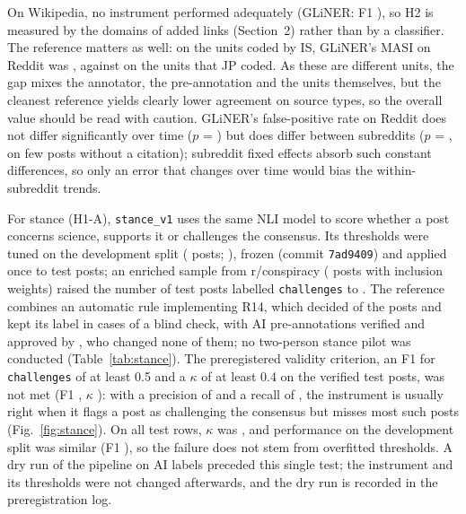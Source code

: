\documentclass[10pt,a4paper]{article}
\newcommand{\kod}[1]{\texttt{#1}}
\begin{document}
On Wikipedia, no instrument performed adequately (GLiNER: F1 \resTestGlinerWikipediaCitesF),
so H2 is measured by the domains of added links (Section~2) rather than by a classifier.
The reference matters as well: on the units coded by IS, GLiNER's
MASI on Reddit was \resTestGlinerRedditMasiIS, against \resTestGlinerRedditMasiJP{} on the
units that JP coded. As these are different units, the gap
mixes the annotator, the pre-annotation and the units themselves, but the cleanest
reference yields clearly lower agreement on source types, so the overall value should be
read with caution.
GLiNER's false-positive rate on Reddit does not differ significantly over time
($p$ = \resDifferentialGlinerRedditPeriodFpP) but does differ between subreddits
($p$ = \resDifferentialGlinerRedditSubredditFpP, on few posts without a citation); subreddit
fixed effects absorb such constant differences, so only an error that changes over time
would bias the within-subreddit trends.

For stance (H1-A), \kod{stance\_v1} uses the same NLI model \cite{laurer2024} to score
whether a post concerns science, supports it or challenges the consensus. Its thresholds
were tuned on the development split (\resHoneADevPosts{} posts; \resHoneAThresholds),
frozen (commit \kod{7ad9409}) and applied once to \resHoneATestPosts{} test posts; an
enriched sample from r/conspiracy (\resEnrichedPosts{} posts with inclusion weights) raised
the number of test posts labelled \kod{challenges} to \resStanceTestChallengesPosts. The
reference combines an automatic rule implementing R14, which decided
\resPlanCStanceAutoShare{} of the posts and kept its label in
\resPlanCStanceRulePrecision{} cases of a blind check, with AI pre-annotations verified and
approved by \resPlanCCheckedBy, who changed none of them; no two-person stance pilot was
conducted (Table~\ref{tab:stance}). The preregistered validity criterion, an F1 for
\kod{challenges} of at least 0.5 and a $\kappa$ of at least 0.4 on the
\resHoneAReviewedPosts{} verified test posts, was not met (F1 \resHoneATestChallengesF,
$\kappa$ \resHoneATestKappa): with a precision of \resHoneATestChallengesPrecision{} and a
recall of \resHoneATestChallengesRecall, the instrument is usually right when it flags a
post as challenging the consensus but misses most such posts (Fig.~\ref{fig:stance}).
On all \resHoneATestPosts{} test rows, $\kappa$ was \resHoneATestAllRowsKappa, and
performance on the development split was similar (F1 \resHoneADevChallengesF), so the
failure does not stem from overfitted thresholds.
A dry run of the pipeline on AI labels preceded this single test; the instrument and its
thresholds were not changed afterwards, and the dry run is recorded in the preregistration
log.
\end{document}
